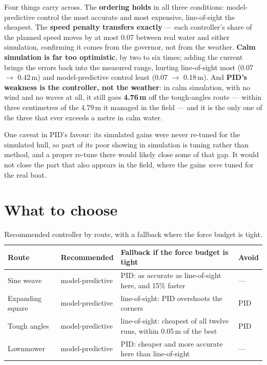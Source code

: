 \documentclass[11pt]{article}
\begin{document}
Four things carry across. The \textbf{ordering holds} in all three conditions:
model-predictive control the most accurate and most expensive, line-of-sight the cheapest.
The \textbf{speed penalty transfers exactly} --- each controller's share of the planned
speed moves by at most 0.07 between real water and either simulation, confirming it comes
from the governor, not from the weather. \textbf{Calm simulation is far too optimistic}, by
two to six times; adding the current brings the errors back into the measured range, hurting
line-of-sight most (0.07 $\rightarrow$ 0.42\,m) and model-predictive control least
(0.07 $\rightarrow$ 0.18\,m). And \textbf{PID's weakness is the controller, not the
weather}: in calm simulation, with no wind and no waves at all, it still goes
\textbf{4.76\,m} off the tough-angles route --- within three centimetres of the 4.79\,m it
managed in the field --- and it is the only one of the three that ever exceeds a metre in
calm water.

One caveat in PID's favour: its simulated gains were never re-tuned for the simulated hull,
so part of its poor showing in simulation is tuning rather than method, and a proper re-tune
there would likely close some of that gap. It would not close the part that also appears in
the field, where the gains \emph{were} tuned for the real boat.

\section{What to choose}

\begin{table}[H]
\centering
\caption{Recommended controller by route, with a fallback where the force budget is tight.}
\label{tab:choice}
\small
\begin{tabularx}{\linewidth}{@{} L{2.6cm} L{2.6cm} Y L{1.5cm} @{}}
\toprule
\textbf{Route} & \textbf{Recommended} & \textbf{Fallback if the force budget is tight} & \textbf{Avoid} \\
\midrule
Sine weave & model-predictive & PID: as accurate as line-of-sight here, and 15\% faster & --- \\
Expanding square & model-predictive & line-of-sight: PID overshoots the corners & PID \\
Tough angles & model-predictive & line-of-sight: cheapest of all twelve runs, within
0.05\,m of the best & PID \\
Lawnmower & model-predictive & PID: cheaper and more accurate here than line-of-sight & --- \\
\bottomrule
\end{tabularx}
\end{table}
\end{document}
